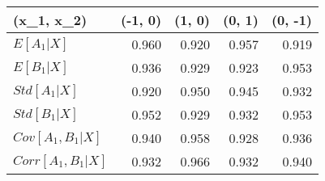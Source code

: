 \begin{tabular}{lrrrr}
\toprule
(x_1, x_2) &  (-1, 0) &  (1, 0) &  (0, 1) &  (0, -1) \\
\midrule
$E[A_1|X]$         &    0.960 &   0.920 &   0.957 &    0.919 \\
$E[B_1|X]$         &    0.936 &   0.929 &   0.923 &    0.953 \\
$Std[A_1|X]$       &    0.920 &   0.950 &   0.945 &    0.932 \\
$Std[B_1|X]$       &    0.952 &   0.929 &   0.932 &    0.953 \\
$Cov[A_1, B_1|X]$  &    0.940 &   0.958 &   0.928 &    0.936 \\
$Corr[A_1, B_1|X]$ &    0.932 &   0.966 &   0.932 &    0.940 \\
\bottomrule
\end{tabular}
